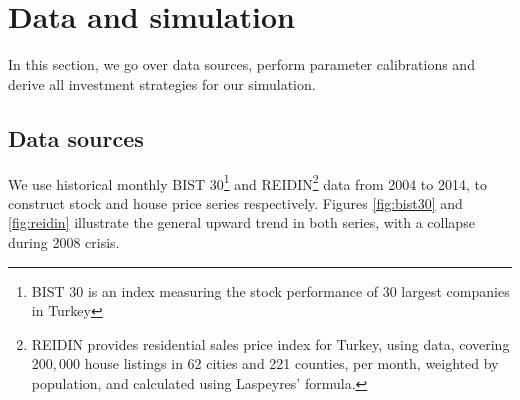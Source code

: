 \documentclass[]{elsarticle}
\begin{document}
\section{Data and simulation}
\label{data}

In this section, we go over data sources, perform parameter calibrations and derive all investment strategies for our simulation.

\subsection{Data sources}

We use historical monthly BIST 30\footnote{BIST 30 is an index measuring the stock performance of 30 largest companies in Turkey} and REIDIN\footnote{REIDIN provides residential sales price index for Turkey, using data, covering $200,000$ house listings in 62 cities and 221 counties, per month, weighted by population, and calculated using Laspeyres' formula.} data from 2004 to 2014, to construct stock and house price series respectively. Figures \ref{fig:bist30} and \ref{fig:reidin} illustrate the general upward trend in both series, with a collapse during 2008 crisis.
\end{document}
